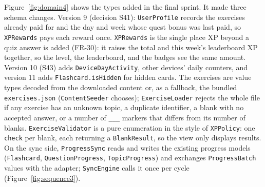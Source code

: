 \documentclass[12pt,letterpaper]{article}
\begin{document}
Figure~\ref{fig:domain4} shows the types added in the final sprint. It made three
schema changes. Version 9 (decision S41): \texttt{UserProfile} records the exercises already paid for
and the day and week whose quest bonus was last paid, so \texttt{XPRewards} pays each
reward once. \texttt{XPRewards} is the single place XP beyond a quiz answer is added
(FR-30): it raises the total and this week's leaderboard XP together, so the level,
the leaderboard, and the badges see the same amount. Version 10 (S43) adds
\texttt{DeviceDayActivity}, other devices' daily counters, and version 11 adds
\texttt{Flashcard.isHidden} for hidden cards. The exercises are value types decoded from the
downloaded content or, as a fallback, the bundled \texttt{exercises.json}
(\texttt{ContentSeeder} chooses); \texttt{ExerciseLoader} rejects the whole file if any
exercise has an unknown topic, a duplicate identifier, a blank with no accepted answer,
or a number of \texttt{\_\_\_} markers that differs from its number of blanks.
\texttt{ExerciseValidator} is a pure enumeration in the style of \texttt{XPPolicy}:
one \texttt{check} per blank, each returning a \texttt{BlankResult}, so the view only
displays results. On the sync side, \texttt{ProgressSync} reads and writes the
existing progress models (\texttt{Flashcard}, \texttt{QuestionProgress},
\texttt{TopicProgress}) and exchanges \texttt{ProgressBatch} values with the adapter;
\texttt{SyncEngine} calls it once per cycle (Figure~\ref{fig:sequence3}).
\end{document}
